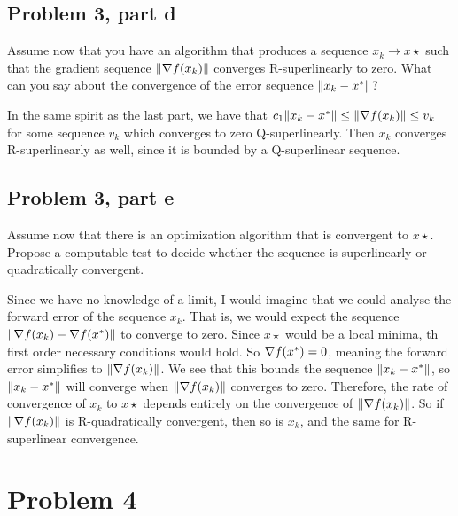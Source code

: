 \newpage
\subsection{Problem 3, part d}
Assume now that you have an algorithm that produces a sequence $x_k \rightarrow x\star$ such that the gradient sequence $\norm{\nabla f(x_k)}$ converges R-superlinearly to zero. What can you say about the convergence of the error sequence $\norm{x_k - x^{*}}$?
\partbreak
\begin{solution}

    In the same spirit as the last part, we have that $c_1\norm{x_k - x^{*}} \leq \norm{\nabla f(x_k)} \leq v_k$ for some sequence $v_k$ which converges to zero Q-superlinearly. Then $x_k$ converges R-superlinearly as well, since it is bounded by a Q-superlinear sequence.  
\end{solution}

\newpage
\subsection{Problem 3, part e}
Assume now that there is an optimization algorithm that is convergent to $x\star$. Propose a computable test to decide whether the sequence is superlinearly or quadratically convergent.
\partbreak
\begin{solution}

    Since we have no knowledge of a limit, I would imagine that we could analyse the forward error of the sequence $x_k$. That is, we would expect the sequence $\norm{\nabla f(x_k) - \nabla f(x^{*})}$ to converge to zero. Since $x\star$ would be a local minima, th first order necessary conditions would hold. So $\nabla f(x^{*}) = 0$, meaning the forward error simplifies to $\norm{\nabla f(x_k)}$. We see that this bounds the sequence $\norm{x_k - x^{*}}$, so $\norm{x_k - x^{*}}$ will converge when $\norm{\nabla f(x_k)}$ converges to zero. Therefore, the rate of convergence of $x_k$ to $x\star$ depends entirely on the convergence of $\norm{\nabla f(x_k)}$. So if $\norm{\nabla f(x_k)}$ is R-quadratically convergent, then so is $x_k$, and the same for R-superlinear convergence.
\end{solution}


\newpage
\section{Problem 4}
